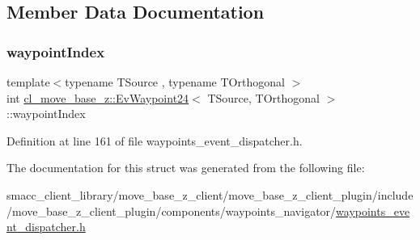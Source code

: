 \subsection{Member Data Documentation}
\mbox{\label{structcl__move__base__z_1_1EvWaypoint24_a387f5ca4189f298747de9a49e85513bc}} 
\subsubsection{\texorpdfstring{waypoint\+Index}{waypointIndex}}
{\footnotesize\ttfamily template$<$typename T\+Source , typename T\+Orthogonal $>$ \\
int \hyperlink{structcl__move__base__z_1_1EvWaypoint24}{cl\+\_\+move\+\_\+base\+\_\+z\+::\+Ev\+Waypoint24}$<$ T\+Source, T\+Orthogonal $>$\+::waypoint\+Index}



Definition at line 161 of file waypoints\+\_\+event\+\_\+dispatcher.\+h.



The documentation for this struct was generated from the following file\+:\begin{DoxyCompactItemize}
\item 
smacc\+\_\+client\+\_\+library/move\+\_\+base\+\_\+z\+\_\+client/move\+\_\+base\+\_\+z\+\_\+client\+\_\+plugin/include/move\+\_\+base\+\_\+z\+\_\+client\+\_\+plugin/components/waypoints\+\_\+navigator/\hyperlink{waypoints__event__dispatcher_8h}{waypoints\+\_\+event\+\_\+dispatcher.\+h}\end{DoxyCompactItemize}
